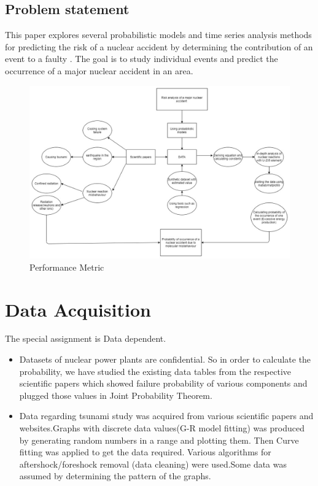 \documentclass{article}
\begin{document}
\subsection{Problem statement}
This paper explores several probabilistic models and time series analysis methods for predicting the risk of a nuclear accident by determining the contribution of an event to a faulty   . The goal is to study individual events and predict the occurrence of a major nuclear accident in an area.
\begin{figure}
    \centering
  \includegraphics[scale=0.5]{Metric.jpg}
    \caption{Performance Metric}
    \label{fig:my_label}
\end{figure}


\section{Data Acquisition }
The special assignment is Data dependent. 
\begin{itemize}
    \item Datasets of nuclear power plants are confidential. So in order to calculate the probability, we have studied the existing data tables from the respective scientific papers\cite{cite9} which showed failure probability of various components and plugged those values in Joint Probability Theorem.
    \item Data regarding tsunami study was acquired from various scientific papers and websites.Graphs with discrete data values(G-R model fitting) was produced by generating random numbers in a range and plotting them. Then Curve fitting was applied to get the data required. Various algorithms for aftershock/foreshock removal (data cleaning)\cite{cite14} were used.Some data was assumed by determining the pattern of the graphs.
\end{itemize}
\end{document}
